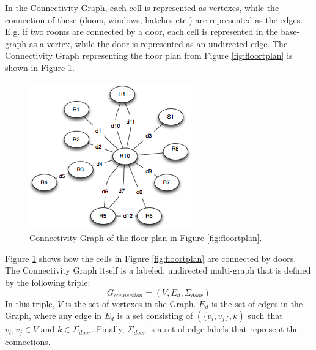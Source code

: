 In the Connectivity Graph, each cell is represented as vertexes, while the connection of these (doors, windows, hatches etc.) are represented as the edges.
E.g. if two rooms are connected by a door, each cell is represented in the base-graph as a vertex, while the door is represented as an undirected edge. 
The Connectivity Graph representing the floor plan from Figure \ref{fig:floortplan} is shown in Figure \ref{fig:connectivitygraph}. 
\begin{figure}[]%
\centering
\includegraphics[width=0.8\columnwidth]{images/connectivitygraph.png}%
\caption{Connectivity Graph of the floor plan in Figure \ref{fig:floortplan}.}%
\label{fig:connectivitygraph}%
\end{figure}%
Figure \ref{fig:connectivitygraph} shows how the cells in Figure \ref{fig:floortplan} are connected by doors. 
The Connectivity Graph itself is a labeled, undirected multi-graph that is defined by the following triple: \\
\begin{equation}
G_{connection} = (V, E_d, \Sigma_{door})
\end{equation}
In this triple, $V$ is the set of vertexes in the Graph. 
$E_d$ is the set of edges in the Graph, where any edge in $E_d$ is a set consisting of $(\{v_i, v_j\}, k)$ such that $v_i, v_j \in V$ and $k \in \Sigma_{door}$.
Finally, $\Sigma_{door}$ is a set of edge labels that represent the connections. 


